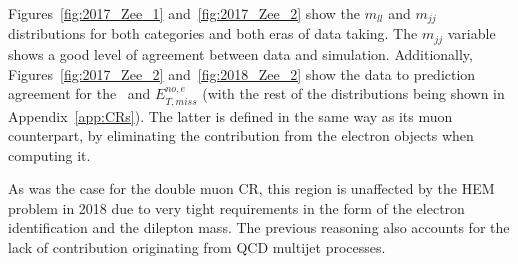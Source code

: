 \hspace{10pt} Figures~\ref{fig:2017_Zee_1} and~\ref{fig:2017_Zee_2} show the $m_{ll}$ and $m_{jj}$ distributions for both categories and both eras of data taking. The $m_{jj}$ variable shows a good level of agreement between data and simulation. Additionally, Figures~\ref{fig:2017_Zee_2} and~\ref{fig:2018_Zee_2} show the data to prediction agreement for the \mindphinoe~and $E_{T, miss}^{no, e}$ (with the rest of the distributions being shown in Appendix~\ref{app:CRs}). The latter is defined in the same way as its muon counterpart, by eliminating the contribution from the electron objects when computing it.

\hspace{10pt} As was the case for the double muon CR, this region is unaffected by the HEM problem in 2018 due to very tight requirements in the form of the electron identification and the dilepton mass. The previous reasoning also accounts for the lack of contribution originating from QCD multijet processes.

